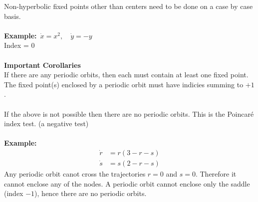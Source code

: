 \documentclass{article}
\newcommand{\example}{\textbf{Example:}}                    %
\begin{document}
Non-hyperbolic fixed points other than centers need to be done on a case
by case basis.
\\
\\
\example\ $\dot{x} = x^2, \quad \dot{y} = -y$
\\ 
Index = 0
\\
\\
\textbf{Important Corollaries} \\
If there are any periodic orbits, then each must contain at least one fixed point.
The fixed point(s) enclosed by a periodic orbit must have indicies summing to $+1$.
\\
\\
If the above is not possible then there are no periodic orbits. This is the 
Poincar\'e index test. (a negative test)
\\
\\
\example\
\begin{align*}
\dot{r} &= r(3 - r -s) \\
\dot{s} &= s(2 - r -s)
\end{align*}
Any periodic orbit canot cross the trajectories $r=0$ and $s=0$. Therefore
it cannot enclose any of the nodes. A periodic orbit cannot enclose only the
saddle (index $-1$), hence there are no periodic orbits.
\\
\end{document}
